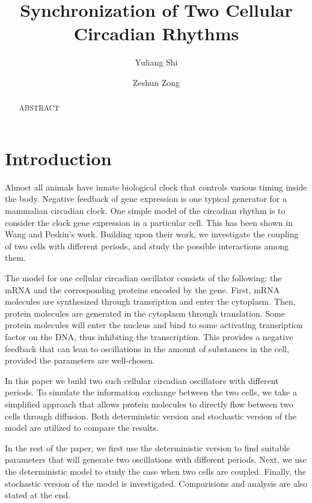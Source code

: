 \documentclass[12pt]{article}
\renewcommand{\(}{\left (}
\renewcommand{\)}{\right )}
\begin{document}
\title{Synchronization of Two Cellular Circadian Rhythms}
\date{}
\author[1]{Yuliang Shi}
\author[2]{Zeshun Zong}


\maketitle
\begin{abstract}
ABSTRACT
\end{abstract}

\section{Introduction}

\hspace{5mm} Almost all animals have innate biological clock that controls various timing inside the body. Negative feedback of gene expression is one typical generator for a mammalian circadian clock. One simple model of the circadian rhythm is to consider the clock gene expression in a particular cell. This has been shown in Wang and Peskin's work. Building upon their work, we investigate the coupling of two cells with different periods, and study the possible interactions among them.

The model for one cellular circadian oscillator consists of the following: the mRNA and the corresponding proteins encoded by the gene. First, mRNA molecules are synthesized through transription and enter the cytoplasm. Then, protein molecules are generated in the cytoplasm through translation. Some protein molecules will enter the nucleus and bind to some activating transription factor on the DNA, thus inhibiting the transcription. This provides a negative feedback that can lean to oscillations in the amount of substances in the cell, provided the parameters are well-chosen.

In this paper we build two such cellular circadian oscillators with different periods. To simulate the information exchange between the two cells, we take a simplified approach that allows protein molecules to directly flow between two cells through diffusion. Both deterministic version and stochastic version of the model are utilized to compare the results.

In the rest of the paper, we first use the deterministic version to find suitable parameters that will generate two oscillations with different periods. Next, we use the deterministic model to study the case when two cells are coupled. Finally, the stochastic version of the model is investigated. Comparisions and analysis are also stated at the end.
\end{document}
